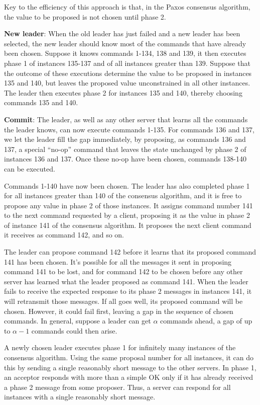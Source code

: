 \documentclass[11pt]{article}
\begin{document}
Key to the efficiency of this approach is that, in the Paxos consensus algorithm, the value to be
proposed is not chosen until phase 2.

\textbf{New leader}: When the old leader has just failed and a new leader has been selected, the new leader should know
most of the commands that have already been chosen. Suppose it knows commands 1-134, 138 and 139, it
then executes phase 1 of instances 135-137 and of all instances greater than 139. Suppose that the
outcome of these executions determine the value to be proposed in instances  135 and 140, but leaves
the proposed value unconstrained in all other instances. The leader then executes phase 2 for
instances 135 and 140, thereby choosing commands 135 and 140.

\textbf{Commit}: The leader, as well as any other server that learns all the commands the leader knows, can now
execute commands 1-135. For commands 136 and 137, we let the leader fill the gap immediately, by
proposing, as commands 136 and 137, a special ``no-op'' command that leaves the state unchanged by
phase 2 of instances 136 and 137. Once these no-op have been chosen, commands 138-140 can be
executed.

Commands 1-140 have now been chosen. The leader has also completed phase 1 for all instances greater
than 140 of the consensus algorithm, and it is free to propose any value in phase 2 of those
instances. It assigns command number 141 to the next command requested by a client, proposing it as
the value in phase 2 of instance 141 of the consensus algorithm. It proposes the next client command
it receives as command 142, and so on.

The leader can propose command 142 before it learns that its proposed command 141 has been chosen.
It's possible for all the messages it sent in proposing command 141 to be lost, and for command 142
to be chosen before any other server has learned what the leader proposed as command 141. When the
leader fails to receive the expected response to its phase 2 messages in instances 141, it will
retransmit those messages. If all goes well, its proposed command will be chosen. However, it could
fail first, leaving a gap in the sequence of chosen commands. In general, suppose a leader can get
\(\alpha\) commands ahead, a gap of up to \(\alpha-1\) commands could then arise.

A newly chosen leader executes phase 1 for infinitely many instances of the consensus algorithm.
Using the same proposal number for all instances, it can do this by sending a single reasonably short
message to the other servers. In phase 1, an acceptor responds with more than a simple OK only if it
has already received a phase 2 message from some proposer. Thus, a server can respond for all
instances with a single reasonably short message.
\end{document}
